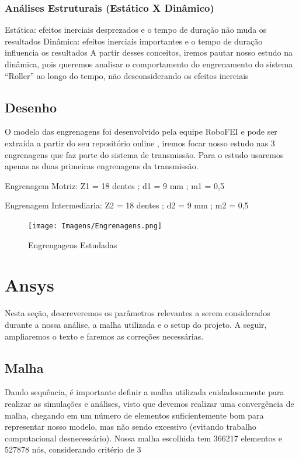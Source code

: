 \documentclass[deposito, acronym, symbols]{fei}
\begin{document}
\subsection{Análises Estruturais (Estático X Dinâmico)}

Estática: efeitos inerciais desprezados e o tempo de duração não muda os resultados
Dinâmica: efeitos inerciais importantes e o tempo de duração influencia os resultados
A partir desses conceitos, iremos pautar nosso estudo na dinâmica, pois queremos analisar o comportamento do engrenamento do sistema “Roller” ao longo do tempo, não desconsiderando os efeitos inerciais

\section{Desenho}

O modelo das engrenagens foi desenvolvido pela equipe RoboFEI e pode ser extraída a partir do seu repositório online \cite{git}, iremos focar nosso estudo nas 3 engrenagens que faz parte do sistema de transmissão. Para o estudo usaremos apenas as duas primeiras engrenagens da transmissão.

Engrenagem Motriz: Z1 = 18 dentes ; d1 = 9 mm ; m1 = 0,5

Engrenagem Intermediaria:  Z2 = 18 dentes ; d2 = 9 mm ; m2 = 0,5

\begin{figure}[!htb]
 \centering
    \caption{Engrengagens Estudadas}
    \texttt{[image: Imagens/Engrenagens.png]}
    \label{fig: Estrutura do Projeto}
 \end{figure}

\chapter{Ansys}
Nesta seção, descreveremos os parâmetros relevantes a serem considerados durante a nossa análise, a malha utilizada e o setup do projeto. A seguir, ampliaremos o texto e faremos as correções necessárias.

\section{Malha}
Dando sequência, é importante definir a malha utilizada cuidadosamente para realizar as simulações e análises, visto que devemos realizar uma convergência de malha, chegando em um número de elementos suficientemente bom para representar nosso modelo, mas não sendo excessivo (evitando trabalho computacional desnecessário). Nossa malha escolhida tem 366217 elementos e 527878 nós, considerando critério de 3%
\end{document}
